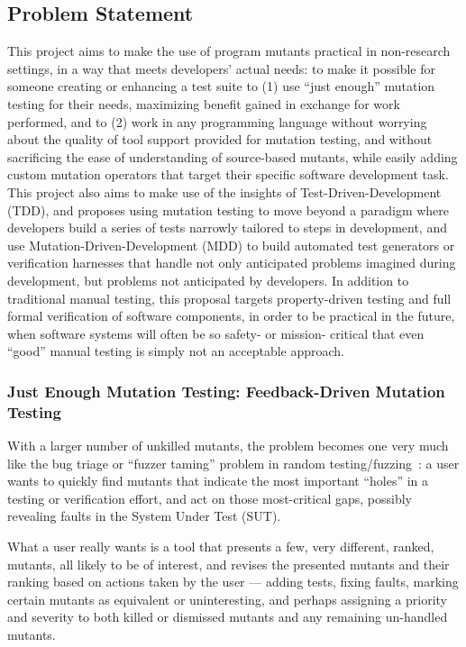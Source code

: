 \subsection{Problem Statement}

This project aims to make the use of program mutants practical in non-research settings, in a way that meets developers' actual needs: to make it possible for someone creating or enhancing a test suite to (1) use ``just enough'' mutation testing for their needs, maximizing benefit gained in exchange for work performed, and to (2) work in any programming language without worrying about the quality of tool support provided for mutation testing, and without sacrificing the ease of understanding of source-based mutants, while easily adding custom mutation operators that target their specific software development task.  This project also aims to make use of the insights of Test-Driven-Development (TDD), and proposes using mutation testing to move beyond a paradigm where developers build a series of tests narrowly tailored to steps in development, and use Mutation-Driven-Development (MDD) to build automated test generators or verification harnesses that handle not only anticipated problems imagined during development, but problems not anticipated by developers.  In addition to traditional manual testing, this proposal targets property-driven testing and full formal verification of software components, in order to be practical in the future, when software systems will often be so safety- or mission- critical that even ``good'' manual testing is simply not an acceptable approach.

\subsubsection{Just Enough Mutation Testing: Feedback-Driven Mutation Testing}

With a larger number of unkilled
mutants, the problem becomes one very much like the bug triage or ``fuzzer
taming'' problem in random testing/fuzzing~\cite{PLDI13,SemCrash}:  a user wants
to quickly find mutants that indicate the most important ``holes'' in a testing
or verification effort, and act on those most-critical gaps, possibly revealing
faults in the System Under Test (SUT). 

What a user really wants is a tool that presents a few, very different, ranked,
mutants, all likely to be of interest, and revises the presented mutants and
their ranking based on actions taken by the user --- adding tests, fixing
faults, marking certain mutants as equivalent or uninteresting, and perhaps
assigning a priority and severity to both killed or dismissed mutants and any
remaining un-handled mutants. 

